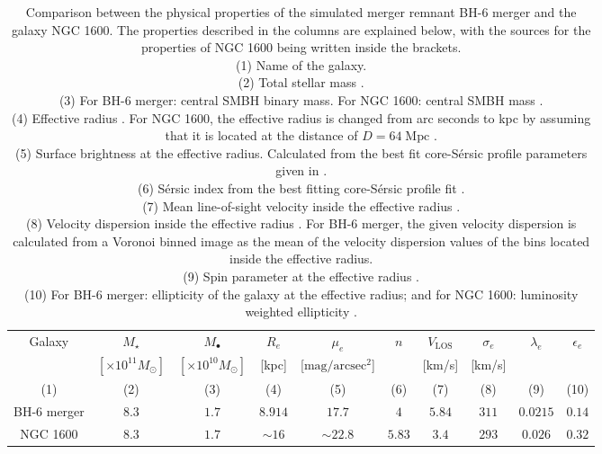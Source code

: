 \documentclass[english, oneside]{HYgradu}
\begin{document}
\begin{table}
	\begin{center}
		\scriptsize
		\begin{tabular}{c c c c c c c c c c}
		\hline
		\hline
		Galaxy & $M_\star$ & $M_\bullet$ & $R_e$ & $\mu_e$ & $n$ & 
		$V_\mathrm{LOS}$ & $\sigma_e$ & $\lambda_e$ &
		$\epsilon_e$ \\
		& $[\times 10^{11} M_\odot]$ & $[\times 10^{10} M_\odot]$ &
		[kpc] & [$\mathrm{mag/arcsec^2}$] & & [km/s] & [km/s] & & \\
		(1) & (2) & (3) & (4) & (5) & (6) & (7) & (8) & (9) & (10) \\
		\hline
		BH-6 merger & $8.3$ & $1.7$ & $8.914$ & $17.7$ & $4$ & $5.84$ & $311$ & $0.0215$ & $0.14$ \\
		NGC 1600 & $8.3$ & $1.7$ & $\sim 16$ & $\sim 22.8$ & $5.83$ & $3.4$ & 
		$293$ & $0.026$ & $0.32$ \\
		\hline
		\end{tabular}
	\end{center}
	\caption{Comparison between the physical properties of the simulated merger remnant BH-6 merger and the galaxy NGC 1600. The properties described in the columns are explained below, with the sources for the properties of NGC 1600 being written inside the brackets. \\
	(1) Name of the galaxy. \\
	(2) Total stellar mass \citep{Thomas2016}. \\
	(3) For BH-6 merger: central SMBH binary mass. For NGC 1600: central SMBH mass \citep{Thomas2016}. \\
	(4) Effective radius \citep{Thomas2016}. For NGC 1600, the effective radius is changed from arc seconds to kpc by assuming that it is located at the distance of $D = 64 \; \mathrm{Mpc}$ \citep{Thomas2016}. \\
	(5) Surface brightness at the effective radius. Calculated from the best fit core-Sérsic profile parameters given in \cite{Thomas2016}. \\
	(6) Sérsic index from the best fitting core-Sérsic profile fit \citep{Thomas2016}. \\
	(7) Mean line-of-sight velocity inside the effective radius \citep{Bender1994}. \\
	(8) Velocity dispersion inside the effective radius \citep{Veale2017veldisp}. For BH-6 merger, the given velocity dispersion is calculated from a Voronoi binned image as the mean of the velocity dispersion values of the bins located inside the effective radius. \\
	(9) Spin parameter at the effective radius \citep{Veale2018lambda}. \\
	(10) For BH-6 merger: ellipticity of the galaxy at the effective radius; and for NGC 1600: luminosity weighted ellipticity \citep{Goullaud2018}.
	}
	\label{table:snap6_vs_NGC1600}
\end{table}
\end{document}
